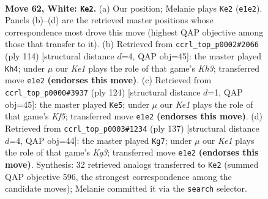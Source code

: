 \documentclass[11pt]{article}
\begin{document}
\clearpage

\begin{figure}[p]\centering
\begin{subfigure}{0.46\textwidth}\centering
\resizebox{\linewidth}{!}{%
\newchessgame
\chessboard[
  setfen={7k/8/1P6/8/R3p1r1/8/8/4K3 w - - 3 62},
  showmover=false,
  pgfstyle=straightmove, color=movearrow, markmove={e1-e2}
]}
\caption{}
\end{subfigure}\hfill
\begin{subfigure}{0.46\textwidth}\centering
\resizebox{\linewidth}{!}{%
\newchessgame
\chessboard[
  setfen={8/R3p1r1/4P3/8/4k3/7K/8/8 w - - 19 58},
  showmover=false,
  pgfstyle=straightmove, color=movearrow, markmove={h3-h4}
]}
\caption{}
\end{subfigure}
\\[4pt]
\begin{subfigure}{0.46\textwidth}\centering
\resizebox{\linewidth}{!}{%
\newchessgame
\chessboard[
  setfen={R7/4k3/8/5K2/p7/5P2/r7/8 w - - 5 63},
  showmover=false,
  pgfstyle=straightmove, color=movearrow, markmove={f5-e5}
]}
\caption{}
\end{subfigure}\hfill
\begin{subfigure}{0.46\textwidth}\centering
\resizebox{\linewidth}{!}{%
\newchessgame
\chessboard[
  setfen={R7/8/P5k1/7p/4K3/8/r7/8 b - - 2 69},
  showmover=false,
  pgfstyle=straightmove, color=movearrow, markmove={g6-g7}
]}
\caption{}
\end{subfigure}
\caption{\textbf{Move 62, White: \texttt{Ke2}.} (a) Our position; Melanie plays \texttt{Ke2} (\texttt{e1e2}). Panels (b)--(d) are the retrieved master positions whose correspondence most drove this move (highest QAP objective among those that transfer to it). (b) Retrieved from \texttt{ccrl\_top\_p0002\#2066} (ply 114) [structural distance $d$=4, QAP obj=45]: the master played \texttt{Kh4}; under $\mu$ our \emph{Ke1} plays the role of that game's \emph{Kh3}; transferred move \texttt{e1e2} \textbf{(endorses this move)}. (c) Retrieved from \texttt{ccrl\_top\_p0000\#3937} (ply 124) [structural distance $d$=1, QAP obj=45]: the master played \texttt{Ke5}; under $\mu$ our \emph{Ke1} plays the role of that game's \emph{Kf5}; transferred move \texttt{e1e2} \textbf{(endorses this move)}. (d) Retrieved from \texttt{ccrl\_top\_p0003\#1234} (ply 137) [structural distance $d$=4, QAP obj=44]: the master played \texttt{Kg7}; under $\mu$ our \emph{Ke1} plays the role of that game's \emph{Kg3}; transferred move \texttt{e1e2} \textbf{(endorses this move)}. Synthesis: 32 retrieved analogs transferred to \texttt{Ke2} (summed QAP objective 596, the strongest correspondence among the candidate moves); Melanie committed it via the \texttt{search} selector.}
\label{fig:thought-m122}
\end{figure}
\end{document}

